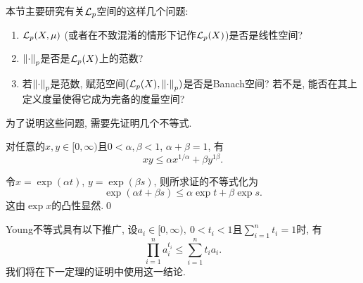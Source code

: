 本节主要研究有关$ \mathcal{L}_p $空间的这样几个问题:
\begin{enumerate}[(1)]
	\item $ \mathcal{L}_p(X,\mu) $ (或者在不致混淆的情形下记作$ \mathcal{L}_p(X) $)是否是线性空间?\label{item:1.7节主要问题1}
	\item $ \left\| \cdot \right\|_p $是否是$ \mathcal{L}_p(X) $上的范数?\label{item:1.7节主要问题2}
	\item 若$ \left\| \cdot \right\|_p $是范数, 赋范空间$ (\mathcal{L}_p(X),\left\| \cdot \right\|_p) $是否是Banach空间? 若不是, 能否在其上定义度量使得它成为完备的度量空间?\label{item:1.7节主要问题3}
\end{enumerate}
为了说明这些问题, 需要先证明几个不等式.

\begin{Lemma}[Young]
	对任意的$ x, y\in[0,\infty) $且$ 0<\alpha,\beta<1 $, $ \alpha+\beta=1 $, 有
	\[
		xy\leqslant \alpha x^{1/\alpha}+\beta y^{1\beta}.
	\]
\end{Lemma}
\begin{Proof}
	令$ x=\exp(\alpha t) $, $ y=\exp(\beta s) $, 则所求证的不等式化为
	\[
		\exp(\alpha t+\beta s)\leqslant\alpha\exp t+\beta\exp s.
	\]
	这由$ \exp x $的凸性显然.\qed
\end{Proof}

\begin{Remark}
	Young不等式具有以下推广, 设$ a_i\in[0,\infty),\ 0<t_i<1 $且$ \sum\limits_{i=1}^nt_i=1 $时, 有
	\[
		\prod_{i=1}^na_i^{t_i}\leqslant\sum_{i=1}^nt_ia_i.
	\]
	我们将在下一定理的证明中使用这一结论.
\end{Remark}


